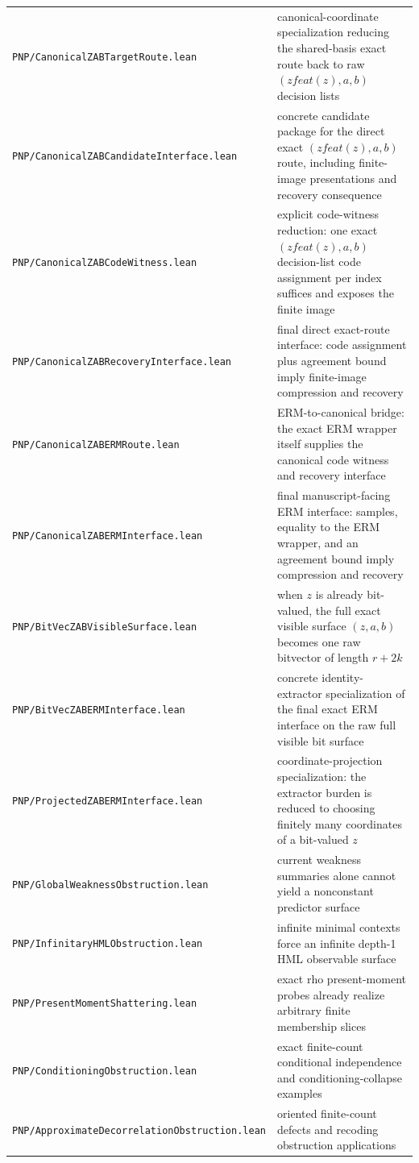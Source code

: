 \documentclass[11pt]{article}
\theoremstyle{remark}
\begin{document}
\begin{center}
\begin{tabular}{ll}
\texttt{PNP/CanonicalZABTargetRoute.lean} & canonical-coordinate specialization reducing the shared-basis exact route back to raw $(zfeat(z),a,b)$ decision lists \\
\texttt{PNP/CanonicalZABCandidateInterface.lean} & concrete candidate package for the direct exact $(zfeat(z),a,b)$ route, including finite-image presentations and recovery consequence \\
\texttt{PNP/CanonicalZABCodeWitness.lean} & explicit code-witness reduction: one exact $(zfeat(z),a,b)$ decision-list code assignment per index suffices and exposes the finite image \\
\texttt{PNP/CanonicalZABRecoveryInterface.lean} & final direct exact-route interface: code assignment plus agreement bound imply finite-image compression and recovery \\
\texttt{PNP/CanonicalZABERMRoute.lean} & ERM-to-canonical bridge: the exact ERM wrapper itself supplies the canonical code witness and recovery interface \\
\texttt{PNP/CanonicalZABERMInterface.lean} & final manuscript-facing ERM interface: samples, equality to the ERM wrapper, and an agreement bound imply compression and recovery \\
\texttt{PNP/BitVecZABVisibleSurface.lean} & when $z$ is already bit-valued, the full exact visible surface $(z,a,b)$ becomes one raw bitvector of length $r+2k$ \\
\texttt{PNP/BitVecZABERMInterface.lean} & concrete identity-extractor specialization of the final exact ERM interface on the raw full visible bit surface \\
\texttt{PNP/ProjectedZABERMInterface.lean} & coordinate-projection specialization: the extractor burden is reduced to choosing finitely many coordinates of a bit-valued $z$ \\
\texttt{PNP/GlobalWeaknessObstruction.lean} & current weakness summaries alone cannot yield a nonconstant predictor surface \\
\texttt{PNP/InfinitaryHMLObstruction.lean} & infinite minimal contexts force an infinite depth-1 HML observable surface \\
\texttt{PNP/PresentMomentShattering.lean} & exact rho present-moment probes already realize arbitrary finite membership slices \\
\texttt{PNP/ConditioningObstruction.lean} & exact finite-count conditional independence and conditioning-collapse examples \\
\texttt{PNP/ApproximateDecorrelationObstruction.lean} & oriented finite-count defects and recoding obstruction applications \\

\end{tabular}
\end{center}
\end{document}
